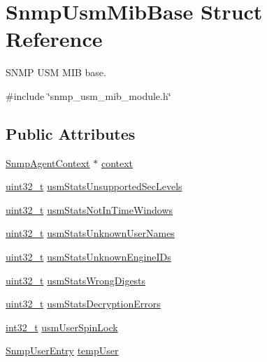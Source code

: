 \hypertarget{structSnmpUsmMibBase}{}\section{Snmp\+Usm\+Mib\+Base Struct Reference}
\label{structSnmpUsmMibBase}


S\+N\+MP U\+SM M\+IB base.  




{\ttfamily \#include \char`\"{}snmp\+\_\+usm\+\_\+mib\+\_\+module.\+h\char`\"{}}

\subsection*{Public Attributes}
\begin{DoxyCompactItemize}
\item 
\hyperlink{snmp__agent_8h_a4c68afef83114acf80065b64191bfdac}{Snmp\+Agent\+Context} $\ast$ \hyperlink{structSnmpUsmMibBase_a7348cb0e2110c37b29fb3ba2501744d9}{context}
\item 
\hyperlink{stdint_8h_a435d1572bf3f880d55459d9805097f62}{uint32\+\_\+t} \hyperlink{structSnmpUsmMibBase_ac846e62c7d7821fc707a4a36fd4a4cbc}{usm\+Stats\+Unsupported\+Sec\+Levels}
\item 
\hyperlink{stdint_8h_a435d1572bf3f880d55459d9805097f62}{uint32\+\_\+t} \hyperlink{structSnmpUsmMibBase_a83af21f56cd9aba9fc178ed23863c61a}{usm\+Stats\+Not\+In\+Time\+Windows}
\item 
\hyperlink{stdint_8h_a435d1572bf3f880d55459d9805097f62}{uint32\+\_\+t} \hyperlink{structSnmpUsmMibBase_a4d7a02467e95ec2584d6355c571e2000}{usm\+Stats\+Unknown\+User\+Names}
\item 
\hyperlink{stdint_8h_a435d1572bf3f880d55459d9805097f62}{uint32\+\_\+t} \hyperlink{structSnmpUsmMibBase_a6f3416c703dbe1b8d741c8b9ecfd1cff}{usm\+Stats\+Unknown\+Engine\+I\+Ds}
\item 
\hyperlink{stdint_8h_a435d1572bf3f880d55459d9805097f62}{uint32\+\_\+t} \hyperlink{structSnmpUsmMibBase_a3120fcc60f60bd2ad9c9c07734d36997}{usm\+Stats\+Wrong\+Digests}
\item 
\hyperlink{stdint_8h_a435d1572bf3f880d55459d9805097f62}{uint32\+\_\+t} \hyperlink{structSnmpUsmMibBase_a2eab3cec26d4f9a22213c3668422dab5}{usm\+Stats\+Decryption\+Errors}
\item 
\hyperlink{stdint_8h_ab1967d8591af1a4e48c37fd2b0f184d0}{int32\+\_\+t} \hyperlink{structSnmpUsmMibBase_a48469936e03465ca06110ee6ef0fde8f}{usm\+User\+Spin\+Lock}
\item 
\hyperlink{structSnmpUserEntry}{Snmp\+User\+Entry} \hyperlink{structSnmpUsmMibBase_a2b38282734d310adb88b0bafaf4143ca}{temp\+User}
\end{DoxyCompactItemize}



